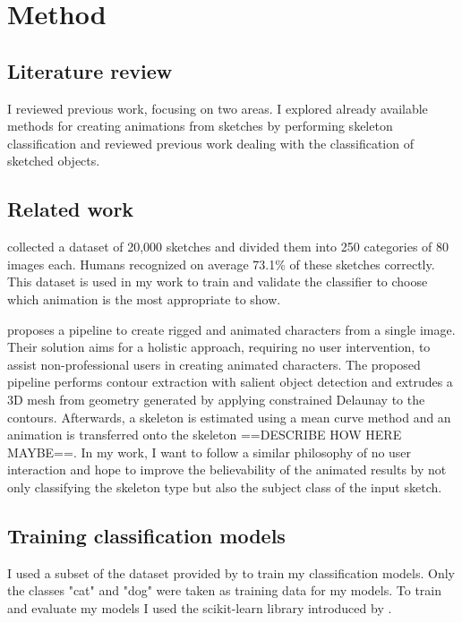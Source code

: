 \chapter{Method}
\label{ch:method}

\section*{Literature review}
I reviewed previous work, focusing on two areas. I explored already available
methods for creating animations from sketches by performing skeleton
classification and reviewed previous work dealing with the classification of
sketched objects.

\section*{Related work}
\textcite{eitz2012hdhso} collected a dataset of 20,000 sketches and divided them
into 250 categories of 80 images each. Humans recognized on average 73.1\% of 
these sketches correctly. This dataset is used in my work to train and validate
the classifier to choose which animation is the most appropriate to show.

\textcite{10.1145/3469877.3490565} proposes a pipeline to create rigged and
animated characters from a single image. Their solution aims for a holistic
approach, requiring no user intervention, to assist non-professional users in
creating animated characters. The proposed pipeline performs contour extraction
with salient object detection and extrudes a 3D mesh from geometry generated by
applying constrained Delaunay to the contours. Afterwards, a skeleton is
estimated using a mean curve method and an animation is transferred onto the
skeleton ==DESCRIBE HOW HERE MAYBE==. In my work, I want to follow a similar
philosophy of no user interaction and hope to improve the believability of the
animated results by not only classifying the skeleton type but also the subject
class of the input sketch.

\section*{Training classification models}
I used a subset of the dataset provided by \textcite{eitz2012hdhso} to
train my classification models. Only the classes "cat" and "dog" were taken as
training data for my models. To train and evaluate my models I used the
scikit-learn library introduced by \textcite{scikit-learn}.
